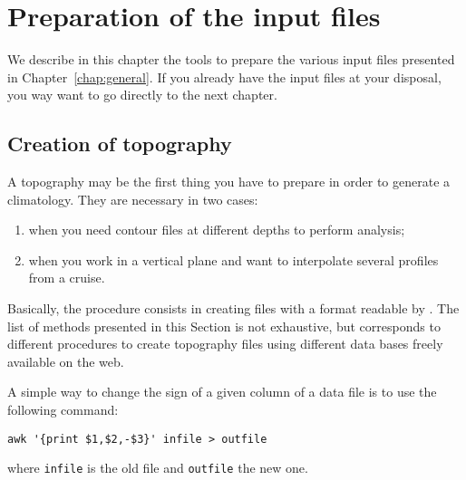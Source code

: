 \chapter{Preparation of the input files\label{Preprocessing}}

We describe in this chapter the tools to prepare the various input files presented in Chapter~\ref{chap:general}. If you already have the input files at your disposal, you way want to go directly to the next chapter.

\minitoc

\section{Creation of topography\label{sec:howtotopo}}

A topography may be the first thing you have to prepare in order to generate a climatology. They are necessary in two cases: 
\begin{enumerate}
\item when you need contour files at different depths to perform analysis;
\item when you work in a vertical plane and want to interpolate several profiles from a cruise.
\end{enumerate} 

Basically, the procedure consists in creating files with a format readable by \diva. The list of methods presented in this Section is not exhaustive, but corresponds to different procedures to create topography files using different data bases freely available on the web. 

\begin{center}
\end{center}

\btips
A simple way to change the sign of a given column of a data file is to use the following command:
\begin{verbatim}
awk '{print $1,$2,-$3}' infile > outfile
\end{verbatim}
where \texttt{infile} is the old file and \texttt{outfile} the new one.

